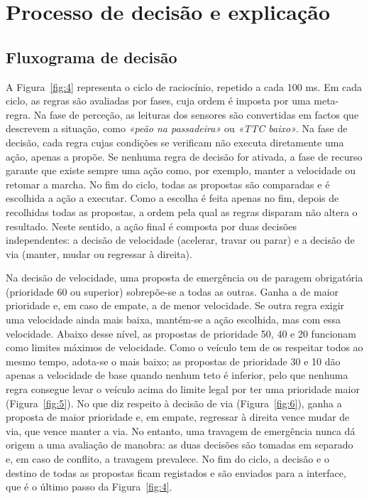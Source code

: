
\chapter{Processo de decisão e explicação}\label{sec:5}

\section{Fluxograma de decisão}\label{sec:5.1}

A Figura~\ref{fig:4} representa o ciclo de raciocínio, repetido a cada 100 ms. Em cada ciclo, as regras são avaliadas por fases, cuja ordem é imposta por uma meta-regra. Na fase de perceção, as leituras dos sensores são convertidas em factos que descrevem a situação, como \emph{«peão na passadeira»} ou \emph{«TTC baixo»}. Na fase de decisão, cada regra cujas condições se verificam não executa diretamente uma ação, apenas a propõe. Se nenhuma regra de decisão for ativada, a fase de recurso garante que existe sempre uma ação como, por exemplo, manter a velocidade ou retomar a marcha. No fim do ciclo, todas as propostas são comparadas e é escolhida a ação a executar. Como a escolha é feita apenas no fim, depois de recolhidas todas as propostas, a ordem pela qual as regras disparam não altera o resultado. Neste sentido, a ação final é composta por duas decisões independentes: a decisão de velocidade (acelerar, travar ou parar) e a decisão de via (manter, mudar ou regressar à direita).

Na decisão de velocidade, uma proposta de emergência ou de paragem obrigatória (prioridade 60 ou superior) sobrepõe-se a todas as outras. Ganha a de maior prioridade e, em caso de empate, a de menor velocidade. Se outra regra exigir uma velocidade ainda mais baixa, mantém-se a ação escolhida, mas com essa velocidade. Abaixo desse nível, as propostas de prioridade 50, 40 e 20 funcionam como limites máximos de velocidade. Como o veículo tem de os respeitar todos ao mesmo tempo, adota-se o mais baixo; as propostas de prioridade 30 e 10 dão apenas a velocidade de base quando nenhum teto é inferior, pelo que nenhuma regra consegue levar o veículo acima do limite legal por ter uma prioridade maior (Figura~\ref{fig:5}). No que diz respeito à decisão de via (Figura~\ref{fig:6}), ganha a proposta de maior prioridade e, em empate, regressar à direita vence mudar de via, que vence manter a via. No entanto, uma travagem de emergência nunca dá origem a uma avaliação de manobra: as duas decisões são tomadas em separado e, em caso de conflito, a travagem prevalece. No fim do ciclo, a decisão e o destino de todas as propostas ficam registados e são enviados para a interface, que é o último passo da Figura~\ref{fig:4}.

